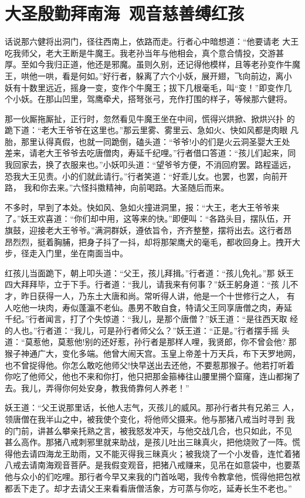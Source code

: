 \chapter{大圣殷勤拜南海~观音慈善缚红孩}

话说那六健将出洞门，径往西南上，依路而走。行者心中暗想道：“他要请老
大王吃我师父，老大王断是牛魔王。我老孙当年与他相会，真个意合情投，交游甚
厚。至如今我归正道，他还是邪魔。虽则久别，还记得他模样，且等老孙变作牛魔
王，哄他一哄，看是何如。”好行者，躲离了六个小妖，展开翅，飞向前边，离小
妖有十数里远近，摇身一变，变作个牛魔王；拔下几根毫毛，叫“变！”即变作几
个小妖。在那山凹里，驾鹰牵犬，搭弩张弓，充作打围的样子，等候那六健将。

那一伙厮拖厮扯，正行时，忽然看见牛魔王坐在中间，慌得兴烘掀、掀烘兴扑
的跪下道：“老大王爷爷在这里也。”那云里雾、雾里云、急如火、快如风都是肉眼
凡胎，那里认得真假，也就一同跪倒，磕头道：“爷爷!小的们是火云洞圣婴大王处
差来，请老大王爷爷去吃唐僧肉，寿延千纪哩。”行者借口答道：“孩儿们起来，同
我回家去，换了衣服来也。”小妖叩头道：“望爷爷方便，不消回府罢。路程遥远，
恐我大王见责。小的们就此请行。”行者笑道：“好乖儿女。也罢，也罢，向前开路，
我和你去来。”六怪抖擞精神，向前喝路。大圣随后而来。

不多时，早到了本处。快如风、急如火撞进洞里，报：“大王，老大王爷爷来
了。”妖王欢喜道：“你们却中用，这等来的快。”即便叫：“各路头目，摆队伍，开
旗鼓，迎接老大王爷爷。”满洞群妖，遵依旨令，齐齐整整，摆将出去。这行者昂
昂烈烈，挺着胸脯，把身子抖了一抖，却将那架鹰犬的毫毛，都收回身上。拽开大
步，径走入门里，坐在南面当中。

红孩儿当面跪下，朝上叩头道：“父王，孩儿拜揖。”行者道：“孩儿免礼。”那
妖王四大拜拜毕，立于下手。行者道：“我儿，请我来有何事？”妖王躬身道：“孩
儿不才，昨日获得一人，乃东土大唐和尚。常听得人讲，他是一个十世修行之人，
有人吃他一块肉，寿似蓬瀛不老仙。愚男不敢自食，特请父王同享唐僧之肉，寿延
千纪。”行者闻言，打了个失惊道：“我儿，是那个唐僧？”妖王道：“是往西天取
经的人也。”行者道：“我儿，可是孙行者师父么？”妖王道：“正是。”行者摆手摇
头道：“莫惹他，莫惹他!别的还好惹，孙行者是那样人哩，我贤郎，你不曾会他?
那猴子神通广大，变化多端。他曾大闹天宫。玉皇上帝差十万天兵，布下天罗地网，
也不曾捉得他。你怎么敢吃他师父!快早送出去还他，不要惹那猴子。他若打听着
你吃了他师父，他也不来和你打，他只把那金箍棒往山腰里搠个窟窿，连山都掬了
去。我儿，弄得你何处安身，教我倚靠何人养老！”

妖王道：“父王说那里话，长他人志气，灭孩儿的威风。那孙行者共有兄弟三
人，领唐僧在我半山之中，被我使个变化，将他师父摄来。他与那猪八戒当时寻到
我的门前，讲甚么攀亲托熟之言，被我怒发冲天，与他交战几合，也只如此，不见
甚么高作。那猪八戒刺邪里就来助战，是孩儿吐出三昧真火，把他烧败了一阵。慌
得他去请四海龙王助雨，又不能灭得我三昧真火；被我烧了一个小发昏，连忙着猪
八戒去请南海观音菩萨。是我假变观音，把猪八戒赚来，见吊在如意袋中，也要蒸
他与众小的们吃哩。那行者今早又来我的门首吆喝，我传令教拿他，慌得他把包袱
都丢下走了。却才去请父王来看看唐僧活象，方可蒸与你吃，延寿长生不老也。”

